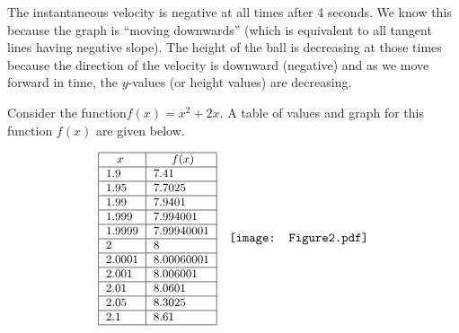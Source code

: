 \documentclass[handout,nooutcomes]{ximera}
\begin{document}
\begin{problem}
\begin{enumerate}
		\begin{freeResponse}		 
		The instantaneous velocity is negative at all times after 4 seconds.  We know this because the graph is ``moving downwards'' (which is equivalent to all tangent lines having negative slope).  The height of the ball is decreasing at those times because the direction of the velocity is downward (negative) and as we move forward in time, the $y$-values (or height values) are decreasing. 
		\end{freeResponse}
			
		\end{enumerate}
			
\end{problem}
			
			
			
			
			
\begin{problem}
Consider the function$f(x)=x^2+2x$.  A table of values and graph for this function $f(x)$ are given below.

\[ \begin{array}{lr}

\small{			
\begin{tabular}{|l|l|}
\hline
\hspace{2mm} $x$ & \hspace{4mm} $f(x)$  \\
\hline
1.9 & 7.41  \\
\hline
1.95 & 7.7025  \\
\hline
1.99 & 7.9401  \\
\hline
1.999 & 7.994001  \\
\hline
1.9999 & 7.99940001  \\
\hline
2 & 8  \\
\hline
2.0001 & 8.00060001  \\
\hline
2.001 & 8.006001  \\
\hline
2.01 & 8.0601  \\
\hline
2.05 & 8.3025  \\
\hline
2.1 & 8.61 \\
\hline
\end{tabular}
}

& 

\texttt{[image: Figure2.pdf]} 

\\

\end{array} \]
	
		\begin{enumerate}
			

\end{enumerate}
\end{problem}
\end{document}

